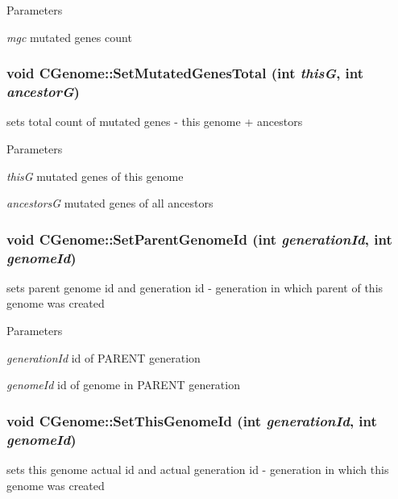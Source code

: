 \begin{DoxyParams}{Parameters}
\item[{\em mgc}]mutated genes count \end{DoxyParams}
\hypertarget{classCGenome_a43880408eec620f379d23a7078b25c85}{
\subsubsection[{SetMutatedGenesTotal}]{\setlength{\rightskip}{0pt plus 5cm}void CGenome::SetMutatedGenesTotal (int {\em thisG}, \/  int {\em ancestorG})}}
\label{classCGenome_a43880408eec620f379d23a7078b25c85}
sets total count of mutated genes -\/ this genome + ancestors


\begin{DoxyParams}{Parameters}
\item[{\em thisG}]mutated genes of this genome \item[{\em ancestorsG}]mutated genes of all ancestors \end{DoxyParams}
\hypertarget{classCGenome_a3029541a0ed7983360b47360e26b65d0}{
\subsubsection[{SetParentGenomeId}]{\setlength{\rightskip}{0pt plus 5cm}void CGenome::SetParentGenomeId (int {\em generationId}, \/  int {\em genomeId})}}
\label{classCGenome_a3029541a0ed7983360b47360e26b65d0}
sets parent genome id and generation id -\/ generation in which parent of this genome was created


\begin{DoxyParams}{Parameters}
\item[{\em generationId}]id of PARENT generation \item[{\em genomeId}]id of genome in PARENT generation \end{DoxyParams}
\hypertarget{classCGenome_a057453c23dcda0e7ce942c91c344f6df}{
\subsubsection[{SetThisGenomeId}]{\setlength{\rightskip}{0pt plus 5cm}void CGenome::SetThisGenomeId (int {\em generationId}, \/  int {\em genomeId})}}
\label{classCGenome_a057453c23dcda0e7ce942c91c344f6df}
sets this genome actual id and actual generation id -\/ generation in which this genome was created


